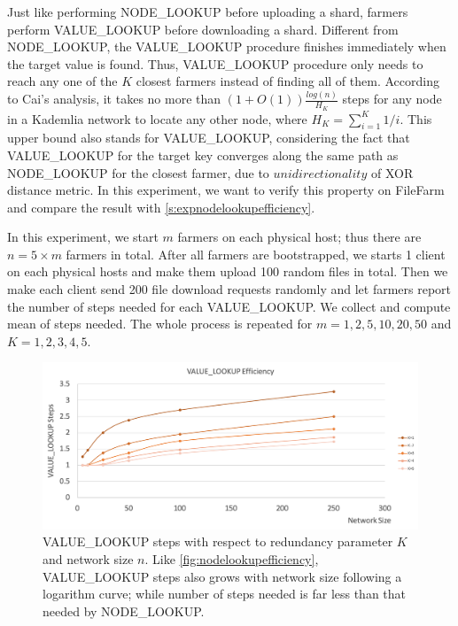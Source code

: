 Just like performing NODE\_LOOKUP before uploading a shard, farmers perform VALUE\_LOOKUP before downloading a shard. Different from NODE\_LOOKUP, the VALUE\_LOOKUP procedure finishes immediately when the target value is found. Thus, VALUE\_LOOKUP procedure only needs to reach any one of the $K$ closest farmers instead of finding all of them. According to Cai's analysis\cite{cai2013probabilistic}, it takes no more than $(1+O(1))\frac{log(n)}{H_{K}}$ steps for any node in a Kademlia network to locate any other node, where $H_K = \sum_{i=1}^{K} 1/i$. This upper bound also stands for VALUE\_LOOKUP, considering the fact that VALUE\_LOOKUP for the target key converges along the same path as NODE\_LOOKUP for the closest farmer, due to $unidirectionality$ of XOR distance metric. In this experiment, we want to verify this property on FileFarm and compare the result with \ref{s:expnodelookupefficiency}.

In this experiment, we start $m$ farmers on each physical host; thus there are $n = 5 \times m$ farmers in total. After all farmers are bootstrapped, we starts 1 client on each physical hosts and make them upload 100 random files in total. Then we make each client send 200 file download requests randomly and let farmers report the number of steps needed for each VALUE\_LOOKUP. We collect and compute mean of steps needed. The whole process is repeated for $m=1,2,5,10,20,50$ and $K=1,2,3,4,5$.

\begin{figure}[hbt]
\centering
  \includegraphics[width=14cm]{charts/chart_value_lookup_efficiency.png}
  \caption[VALUE\_LOOKUP steps with respect to $K$ and network size $n$]{VALUE\_LOOKUP steps with respect to redundancy parameter $K$ and network size $n$. Like \ref{fig:nodelookupefficiency}, VALUE\_LOOKUP steps also grows with network size following a logarithm curve; while number of steps needed is far less than that needed by NODE\_LOOKUP.}
  \label{fig:valuelookupefficiency}
\end{figure}

